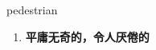 
\begin{frame}
{\huge pedestrian}
\begin{center}
\begin{enumerate}\Large
  \item \textbf{平庸无奇的，令人厌倦的}
\end{enumerate}
\end{center}
\end{frame}
